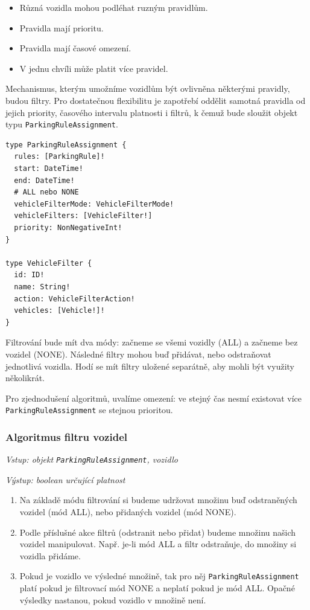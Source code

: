 \begin{itemize}
  \item Různá vozidla mohou podléhat ruzným pravidlům.
  \item Pravidla mají prioritu.
  \item Pravidla mají časové omezení.
  \item V jednu chvíli může platit více pravidel.
\end{itemize}

Mechanismus, kterým umožníme vozidlům být ovlivněna některými pravidly,
budou filtry.
Pro dostatečnou flexibilitu je zapotřebí oddělit samotná pravidla od jejich
priority, časového intervalu platnosti i filtrů,
k čemuž bude sloužit objekt typu \texttt{ParkingRuleAssignment}.

\begin{lstlisting}
type ParkingRuleAssignment {
  rules: [ParkingRule]!
  start: DateTime!
  end: DateTime!
  # ALL nebo NONE
  vehicleFilterMode: VehicleFilterMode!
  vehicleFilters: [VehicleFilter!]
  priority: NonNegativeInt!
}

type VehicleFilter {
  id: ID!
  name: String!
  action: VehicleFilterAction!
  vehicles: [Vehicle!]!
}
\end{lstlisting}

Filtrování bude mít dva módy: začneme se všemi vozidly (ALL) a začneme bez vozidel (NONE).
Následné filtry mohou buď přidávat, nebo odstraňovat jednotlivá vozidla.
Hodí se mít filtry uložené separátně, aby mohli být využity několikrát.

Pro zjednodušení algoritmů, uvalíme omezení: ve stejný čas nesmí existovat více \texttt{ParkingRuleAssignment}
se stejnou prioritou.

\subsubsection*{Algoritmus filtru vozidel}

\textit{Vstup: objekt \texttt{ParkingRuleAssignment}, vozidlo}

\textit{Výstup: boolean určující platnost}
\begin{enumerate}
  \item Na základě módu filtrování si budeme udržovat množinu buď odstraněných vozidel (mód ALL), nebo přidaných vozidel (mód NONE).
  \item Podle příslušné akce filtrů (odstranit nebo přidat) budeme množinu našich vozidel manipulovat. Např. je-li mód ALL a filtr odstraňuje, do množiny si vozidla přidáme.
  \item Pokud je vozidlo ve výsledné množině, tak pro něj \texttt{ParkingRuleAssignment} platí pokud je filtrovací mód NONE a neplatí pokud je mód ALL. Opačné výsledky nastanou, pokud vozidlo v množině není.
\end{enumerate}

